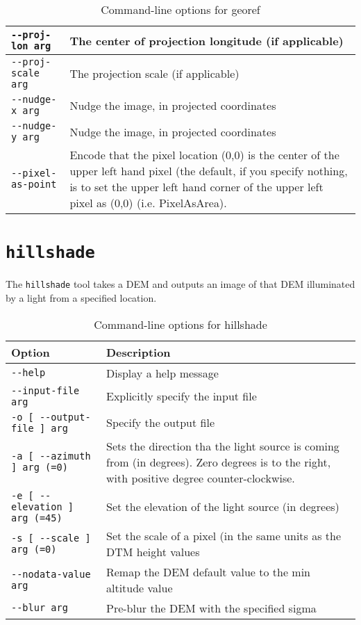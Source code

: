 \begin{table}
\begin{tabular}{|l|l|}
\verb#--proj-lon arg# & The center of projection longitude (if applicable) \\ \hline
\verb#--proj-scale arg# & The projection scale (if applicable) \\ \hline
\verb#--nudge-x arg# & Nudge the image, in projected coordinates \\ \hline
\verb#--nudge-y arg# & Nudge the image, in projected coordinates \\ \hline
\verb#--pixel-as-point# & Encode that the pixel location (0,0) is the center of the upper left hand pixel (the default, if you specify nothing, is to set the upper left hand corner of the upper left pixel as (0,0) (i.e. PixelAsArea). \\ \hline
\end{tabular}
\caption{Command-line options for georef}
\label{tbl:georef}
\end{table}

\section{{\tt hillshade}}\label{sec:hillshade}

The \verb#hillshade# tool takes a DEM and outputs an image of that DEM illuminated by a light from a specified location.

\begin{table}
\begin{tabular}{|l|l|} \hline
Option & Description \\ \hline \hline
\verb#--help# & Display a help message\\ \hline
\verb#--input-file arg# & Explicitly specify the input file\\ \hline
\verb#-o [ --output-file ] arg# & Specify the output file\\ \hline
\verb#-a [ --azimuth ] arg (=0)# & Sets the direction tha the light source is coming from (in degrees).  Zero degrees is to the right, with positive degree counter-clockwise.\\ \hline
\verb#-e [ --elevation ] arg (=45)# & Set the elevation of the light source (in degrees)\\ \hline
\verb#-s [ --scale ] arg (=0)# & Set the scale of a pixel (in the same units as the DTM height values\\ \hline
\verb#--nodata-value arg# & Remap the DEM default value to the min altitude value\\ \hline
\verb#--blur arg# & Pre-blur the DEM with the specified sigma\\ \hline
\end{tabular}
\caption{Command-line options for hillshade}
\label{tbl:hillshade}
\end{table}

